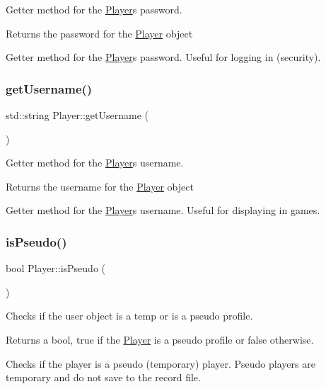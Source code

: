 Getter method for the \hyperlink{classPlayer}{Player}\textquotesingle{}s password. 

\begin{DoxyReturn}{Returns}
the password for the \hyperlink{classPlayer}{Player} object
\end{DoxyReturn}
Getter method for the \hyperlink{classPlayer}{Player}\textquotesingle{}s password. Useful for logging in (security). \mbox{\label{classPlayer_a73c00480e9459d52998262f23f6fc5dc}} 
\subsubsection{\texorpdfstring{get\+Username()}{getUsername()}}
{\footnotesize\ttfamily std\+::string Player\+::get\+Username (\begin{DoxyParamCaption}{ }\end{DoxyParamCaption})}



Getter method for the \hyperlink{classPlayer}{Player}\textquotesingle{}s username. 

\begin{DoxyReturn}{Returns}
the username for the \hyperlink{classPlayer}{Player} object
\end{DoxyReturn}
Getter method for the \hyperlink{classPlayer}{Player}\textquotesingle{}s username. Useful for displaying in games. \mbox{\label{classPlayer_a50aa73eae22ec3435d3de2e556bd1fec}} 
\subsubsection{\texorpdfstring{is\+Pseudo()}{isPseudo()}}
{\footnotesize\ttfamily bool Player\+::is\+Pseudo (\begin{DoxyParamCaption}{ }\end{DoxyParamCaption})}



Checks if the user object is a temp or is a pseudo profile. 

\begin{DoxyReturn}{Returns}
a bool, true if the \hyperlink{classPlayer}{Player} is a pseudo profile or false otherwise.
\end{DoxyReturn}
Checks if the player is a pseudo (temporary) player. Pseudo players are temporary and do not save to the record file. \mbox{\label{classPlayer_a7bdcb72d5d22f6f7c1dfa48d960b6d73}} 

